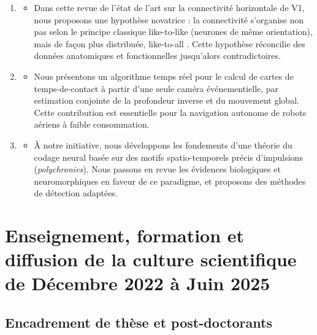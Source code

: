 \documentclass[10pt,french,a4paper]{article}%
\begin{document}
\begin{enumerate}
\item[A51] %
\begin{itemize}
  \item Dans cette revue de l'état de l'art sur la connectivité horizontale de V1, nous proposons une hypothèse novatrice : la connectivité s'organise non pas selon le principe classique \og like-to-like \fg{} (neurones de même orientation), mais de façon plus distribuée, \og like-to-all \fg{}. Cette hypothèse réconcilie des données anatomiques et fonctionnelles jusqu'alors contradictoires.
\end{itemize}


\item[C9] %
\begin{itemize}
  \item Nous présentons un algorithme temps réel pour le calcul de cartes de temps-de-contact à partir d'une seule caméra événementielle, par estimation conjointe de la profondeur inverse et du mouvement global. Cette contribution est essentielle pour la navigation autonome de robots aériens à faible consommation.
\end{itemize}

\item[C8] %
\begin{itemize}
  \item À notre initiative, nous développons les fondements d'une théorie du codage neural basée sur des motifs spatio-temporels précis d'impulsions (\emph{polychronies}). Nous passons en revue les évidences biologiques et neuromorphiques en faveur de ce paradigme, et proposons des méthodes de détection adaptées.
\end{itemize}


\end{enumerate}
\newpage
\section{Enseignement, formation et diffusion de la culture scientifique de Décembre 2022 à Juin 2025} %

\subsection{Encadrement de thèse et post-doctorants} %
\end{document}

